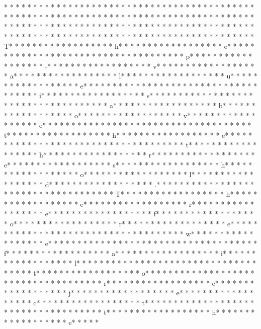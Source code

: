 * * *  * * *  * * *  *  * * *  *  * * *  * * *  * * *  *  * * *  *  * * *  * * *  * * *  *  * * *  *  * * *  *  * * *  * * *  * * *  *  * * *  *  * * *  *  * * *  * * *  * * *  *  * * *  *  * * *  *  * * *  * * *  * * *  *  * * *  *  * * *  *  * * *  * * *  * * *  *  * * *  *  * * *  *  * * *  * * *  * * *  *  * * *  *  * * *  *  * * *  * * *  * * *  *  * * *  *  * * *  *  * * *  * * *  * * *  *  * * *  *  * * *  * T* * *  * * *  * * *  *  * * *  *  * * *  * h* * *  * * *  * * *  *  * * *  *  * * *  * e* * *  * * *  * * *  *  * * *  *  * * *  *  * * *  * * *  * * *  *  * * *  *  * * *  * p* * *  * * *  * * *  *  * * *  *  * * *  * -* * *  * * *  * * *  *  * * *  *  * * *  * v* * *  * * *  * * *  *  * * *  *  * * *  * a* * *  * * *  * * *  *  * * *  *  * * *  * l* * *  * * *  * * *  *  * * *  *  * * *  * u* * *  * * *  * * *  *  * * *  *  * * *  * e* * *  * * *  * * *  *  * * *  *  * * *  *  * * *  * * *  * * *  *  * * *  *  * * *  * i* * *  * * *  * * *  *  * * *  *  * * *  * s* * *  * * *  * * *  *  * * *  *  * * *  *  * * *  * * *  * * *  *  * * *  *  * * *  * a* * *  * * *  * * *  *  * * *  *  * * *  * b* * *  * * *  * * *  *  * * *  *  * * *  * o* * *  * * *  * * *  *  * * *  *  * * *  * v* * *  * * *  * * *  *  * * *  *  * * *  * e* * *  * * *  * * *  *  * * *  *  * * *  *  * * *  * * *  * * *  *  * * *  *  * * *  * t* * *  * * *  * * *  *  * * *  *  * * *  * h* * *  * * *  * * *  *  * * *  *  * * *  * e* * *  * * *  * * *  *  * * *  *  * * *  *  * * *  * * *  * * *  *  * * *  *  * * *  * t* * *  * * *  * * *  *  * * *  *  * * *  * h* * *  * * *  * * *  *  * * *  *  * * *  * r* * *  * * *  * * *  *  * * *  *  * * *  * e* * *  * * *  * * *  *  * * *  *  * * *  * s* * *  * * *  * * *  *  * * *  *  * * *  * h* * *  * * *  * * *  *  * * *  *  * * *  * o* * *  * * *  * * *  *  * * *  *  * * *  * l* * *  * * *  * * *  *  * * *  *  * * *  * d* * *  * * *  * * *  *  * * *  *  * * *  * .* * *  * * *  * * *  *  * * *  *  * * *  *  * * *  * * *  * * *  *  * * *  *  * * *  * T* * *  * * *  * * *  *  * * *  *  * * *  * h* * *  * * *  * * *  *  * * *  *  * * *  * e* * *  * * *  * * *  *  * * *  *  * * *  * r* * *  * * *  * * *  *  * * *  *  * * *  * e* * *  * * *  * * *  *  * * *  *  * * *  * f* * *  * * *  * * *  *  * * *  *  * * *  * o* * *  * * *  * * *  *  * * *  *  * * *  * r* * *  * * *  * * *  *  * * *  *  * * *  * e* * *  * * *  * * *  *  * * *  *  * * *  *  * * *  * * *  * * *  *  * * *  *  * * *  * w* * *  * * *  * * *  *  * * *  *  * * *  * e* * *  * * *  * * *  *  * * *  *  * * *  *  * * *  * * *  * * *  *  * * *  *  * * *  * f* * *  * * *  * * *  *  * * *  *  * * *  * a* * *  * * *  * * *  *  * * *  *  * * *  * i* * *  * * *  * * *  *  * * *  *  * * *  * l* * *  * * *  * * *  *  * * *  *  * * *  *  * * *  * * *  * * *  *  * * *  *  * * *  * t* * *  * * *  * * *  *  * * *  *  * * *  * o* * *  * * *  * * *  *  * * *  *  * * *  *  * * *  * * *  * * *  *  * * *  *  * * *  * r* * *  * * *  * * *  *  * * *  *  * * *  * e* * *  * * *  * * *  *  * * *  *  * * *  * j* * *  * * *  * * *  *  * * *  *  * * *  * e* * *  * * *  * * *  *  * * *  *  * * *  * c* * *  * * *  * * *  *  * * *  *  * * *  * t* * *  * * *  * * *  *  * * *  *  * * *  *  * * *  * * *  * * *  *  * * *  *  * * *  * t* * *  * * *  * * *  *  * * *  *  * * *  * h* * *  * * *  * * *  *  * * *  *  * * *  * e* * *  * * 